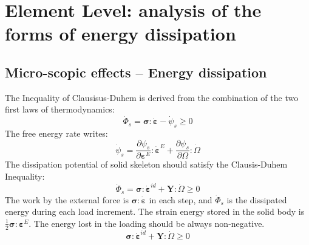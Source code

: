 \documentclass[preprint,review,12pt]{elsarticle}
\begin{document}
\section{Element Level: analysis of the forms of energy dissipation}
\subsection{Micro-scopic effects -- Energy dissipation}
%
The Inequality of Clausisus-Duhem is derived from the combination of the two first laws of thermodynamics:
%
\begin{equation}
 \label{eq:ICD1}
  \dot\varPhi_s=\bm\sigma:\dot{\bm\varepsilon}-\dot{\psi}_s \ge 0
\end{equation}
%
The free energy rate writes:
%
\begin{equation}
\label{eq:ratefreeenergy}
    \dot{\psi}_s=\frac{\partial \psi_s}{\partial \bm\varepsilon^E}:\dot{\bm\varepsilon}^E
    + \frac{\partial \psi_s}{\partial \bm\varOmega}:\dot{\bm\varOmega}
\end{equation}
%
The dissipation potential of solid skeleton should satisfy the Clausis-Duhem Inequality:
%
\begin{equation}\label{ICD2}
   \dot\varPhi_s=\bm\sigma:\dot{\bm\varepsilon}^{id}+\bm{Y}:\dot{\bm\varOmega} \ge 0
\end{equation}
%
The work by the external force is $\bm\sigma:\dot{\bm\varepsilon}$ in each step, and $\dot\varPhi_s$ is the dissipated energy during each load increment. The strain energy stored in the solid body is $\frac{1}{2}\bm\sigma:\bm\varepsilon^E$. The energy lost in the loading should be always non-negative.
%
%
\begin{equation}\label{eq:ICD3}
   \bm\sigma:\dot{\bm\varepsilon}^{id}+\bm{Y}:\dot{\bm\varOmega} \ge 0
\end{equation}
\end{document}
